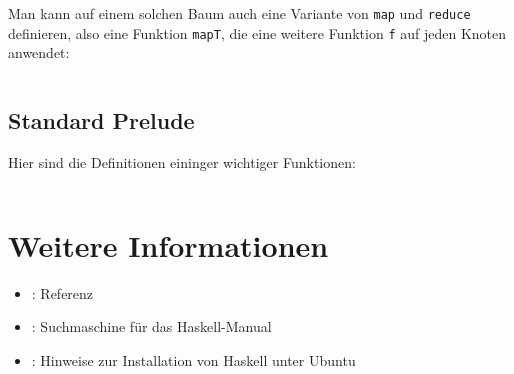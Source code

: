 Man kann auf einem solchen Baum auch eine Variante von \texttt{map} und 
\texttt{reduce} definieren,
also eine Funktion \texttt{mapT}, die eine weitere Funktion \texttt{f} auf jeden
Knoten anwendet:

\inputminted[numbersep=5pt, tabsize=4]{haskell}{scripts/haskell/mapt.hs}

\subsection{Standard Prelude}
Hier sind die Definitionen eininger wichtiger Funktionen:
\inputminted[numbersep=5pt, tabsize=4]{haskell}{scripts/haskell/standard-definitions.hs}

\section{Weitere Informationen}
\begin{itemize}
    \item \href{http://hackage.haskell.org/package/base-4.6.0.1}{}: Referenz
    \item \href{http://www.haskell.org/hoogle/}{}: Suchmaschine für das Haskell-Manual
    \item \href{http://wiki.ubuntuusers.de/Haskell}{}: Hinweise zur Installation von Haskell unter Ubuntu
\end{itemize}


